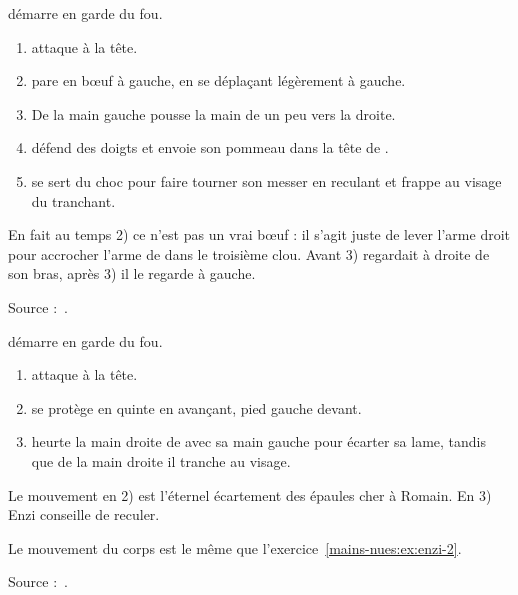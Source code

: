 \begin{technique}

\D démarre en garde du fou.

\begin{enumerate}
	\item \A attaque à la tête.
	\item \D pare en bœuf à gauche, en se déplaçant légèrement à gauche.
	\item De la main gauche \D pousse la main de \A un peu vers la droite.
	\item \D défend des doigts et envoie son pommeau dans la tête de \A.
	\item \D se sert du choc pour faire tourner son messer en reculant et frappe \A au visage du tranchant.
\end{enumerate}

En fait au temps 2) ce n'est pas un vrai bœuf : il s'agit juste de lever l'arme droit pour accrocher l'arme de \A dans le troisième clou.
Avant 3) \D regardait \A à droite de son bras, après 3) il le regarde à gauche.

Source :~\cite{enzi:dijon:messer_inner:2015}.

\end{technique}


\begin{technique}

\D démarre en garde du fou.

\begin{enumerate}
	\item \A attaque à la tête.
	\item \D se protège en quinte en avançant, pied gauche devant.
	\item \D heurte la main droite de \A avec sa main gauche pour écarter sa lame, tandis que de la main droite il tranche au visage.
\end{enumerate}

Le mouvement en 2) est l'éternel écartement des épaules cher à Romain.
En 3) Enzi conseille de reculer.

Le mouvement du corps est le même que l'exercice~\ref{mains-nues:ex:enzi-2}.

Source :~\cite{enzi:dijon:messer_inner:2015}.

\end{technique}


